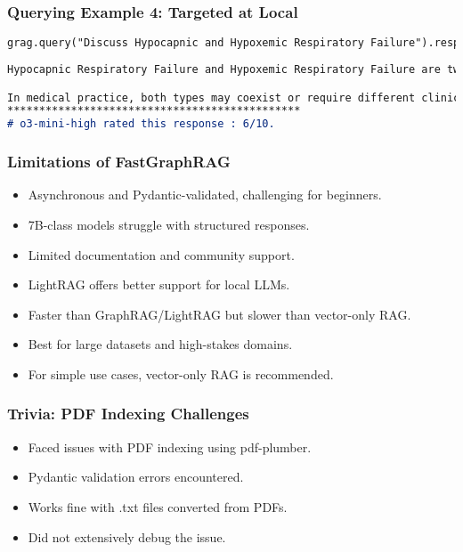 \begin{frame}[fragile]\frametitle{Querying Example 4: Targeted at Local}
        \begin{lstlisting}[language=markdown]
    grag.query("Discuss Hypocapnic and Hypoxemic Respiratory Failure").response
	
Hypocapnic Respiratory Failure and Hypoxemic Respiratory Failure are two distinct categories of respiratory failure, each characterized by different clinical features. Conversely,\ldots Accurate assessment and differentiation between these conditions are crucial for appropriate management and treatment.

In medical practice, both types may coexist or require different clinical interventions based on the specific underlying pathology.
**********************************************
# o3-mini-high rated this response : 6/10.	
    \end{lstlisting}

\end{frame}

\begin{frame}[fragile]\frametitle{Limitations of FastGraphRAG}
    \begin{itemize}
        \item Asynchronous and Pydantic-validated, challenging for beginners.
        \item 7B-class models struggle with structured responses.
        \item Limited documentation and community support.
        \item LightRAG offers better support for local LLMs.
        \item Faster than GraphRAG/LightRAG but slower than vector-only RAG.
        \item Best for large datasets and high-stakes domains.
        \item For simple use cases, vector-only RAG is recommended.
    \end{itemize}
\end{frame}

\begin{frame}[fragile]\frametitle{Trivia: PDF Indexing Challenges}
    \begin{itemize}
        \item Faced issues with PDF indexing using pdf-plumber.
        \item Pydantic validation errors encountered.
        \item Works fine with .txt files converted from PDFs.
        \item Did not extensively debug the issue.
    \end{itemize}
\end{frame}

